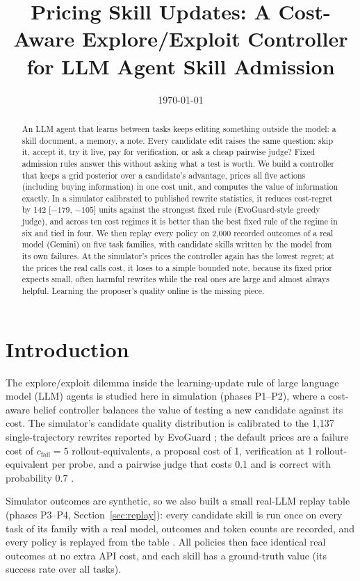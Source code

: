 \documentclass[11pt]{article}
\title{Pricing Skill Updates: A Cost-Aware Explore/Exploit Controller for LLM Agent Skill Admission}
\author{Vishruth Hegde\thanks,
  Arav Shah\thanks,
  Ravi Kirasur\thanks,
  Vipin Sharma\thanks,
  Pradeep Shet\thanks}
\date{\today}
\begin{document}
\maketitle

\begin{abstract}
An LLM agent that learns between tasks keeps editing something outside the model: a skill
document, a memory, a note.  Every candidate edit raises the same question: skip it, accept
it, try it live, pay for verification, or ask a cheap pairwise judge?  Fixed admission rules
answer this without asking what a test is worth.  We build a controller that keeps a grid
posterior over a candidate's advantage, prices all five actions (including buying
information) in one cost unit, and computes the value of information exactly.  In a
simulator calibrated to published rewrite statistics, it reduces cost-regret by 142
[$-179$, $-105$] units against the strongest fixed rule (EvoGuard-style greedy judge), and
across ten cost regimes it is better than the best fixed rule of the regime in six and tied
in four.  We then replay every policy on 2,000 recorded outcomes of a real model (Gemini) on
five task families, with candidate skills written by the model from its own failures.  At the
simulator's prices the controller again has the lowest regret; at the prices the real calls
cost, it loses to a simple bounded note, because its fixed prior expects small, often harmful
rewrites while the real ones are large and almost always helpful.  Learning the proposer's
quality online is the missing piece.
\end{abstract}

\section{Introduction}
The explore/exploit dilemma inside the learning-update rule of large language model (LLM)
agents is studied here in simulation (phases P1--P2), where a cost-aware belief controller
balances the value of testing a new candidate against its cost.  The simulator's candidate
quality distribution is calibrated to the 1,137 single-trajectory rewrites reported by
EvoGuard \citep{evo2026}; the default prices are a failure cost of $c_{\text{fail}} = 5$
rollout-equivalents, a proposal cost of 1, verification at 1 rollout-equivalent per probe,
and a pairwise judge that costs 0.1 and is correct with probability 0.7
\citep{simspec}.

Simulator outcomes are synthetic, so we also built a small real-LLM replay table (phases
P3--P4, Section~\ref{sec:replay}): every candidate skill is run once on every task of its
family with a real model, outcomes and token counts are recorded, and every policy is replayed
from the table \citep{replayspec}.  All policies then face identical real outcomes at no extra
API cost, and each skill has a ground-truth value (its success rate over all tasks).
\end{document}
